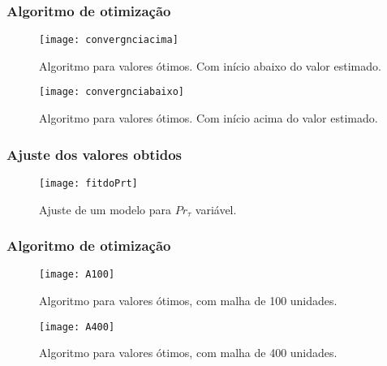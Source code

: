 \documentclass[xcolor=dvipsnames,10pt,aspectratio=169]{beamer}
\begin{document}
	
	
	
		
		\begin{frame}
		\frametitle{Algoritmo de otimização}
		\begin{minipage}[h!]{0.45\textwidth}
			\begin{figure}
				\centering
				\texttt{[image: convergnciacima]}
				\caption{Algoritmo para valores ótimos. Com início abaixo do valor estimado.}
				\label{temperatura}
			\end{figure}
		\end{minipage}\hfill
		\begin{minipage}[h!]{0.45\textwidth}
			\begin{figure}
				\centering
				\texttt{[image: convergnciabaixo]}
				\caption{Algoritmo para valores ótimos. Com início acima do valor estimado.}
				\label{temperatura}
			\end{figure}
		\end{minipage}		
		\end{frame}	
	
	
	
	
		\begin{frame}
		\frametitle{Ajuste dos valores obtidos}
		\begin{figure}
			\centering
			\texttt{[image: fitdoPrt]}
			\caption{Ajuste de um modelo para $Pr_\tau$ variável.}
			\label{temperatura}
		\end{figure}
		\end{frame}	
	
		
		\begin{frame}
		\frametitle{Algoritmo de otimização}
		\begin{minipage}[h!]{0.45\textwidth}
			\begin{figure}
				\centering
				\texttt{[image: A100]}
				\caption{Algoritmo para valores ótimos, com malha de 100 unidades.}
				\label{temperatura}
			\end{figure}
		\end{minipage}\hfill
		\begin{minipage}[h!]{0.45\textwidth}
			\begin{figure}
				\centering
				\texttt{[image: A400]}
				\caption{Algoritmo para valores ótimos, com malha de 400 unidades.}
				\label{temperatura}
			\end{figure}
		\end{minipage}		
	\end{frame}	
		
\end{document}
